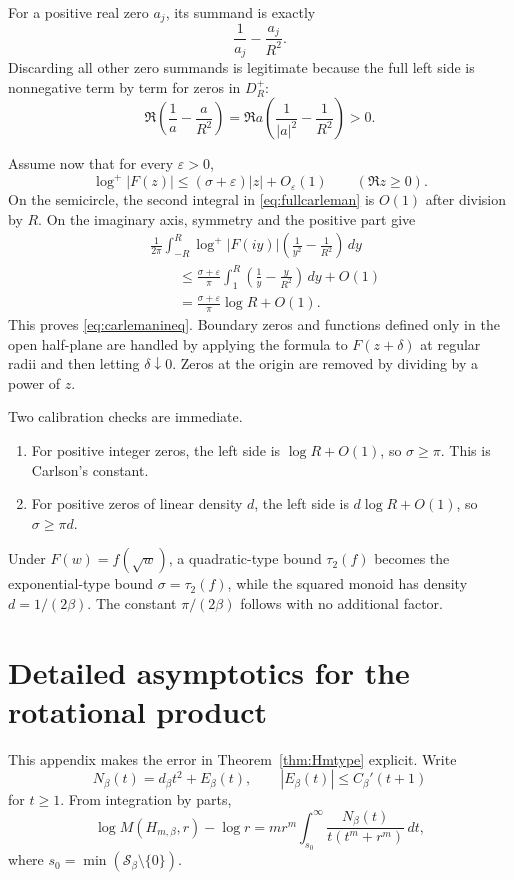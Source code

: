 \documentclass[11pt,oneside]{article}
\theoremstyle{definition}
\theoremstyle{remark}
\newcommand{\Sbeta}{\mathcal S_\beta}
\begin{document}
For a positive real zero $a_j$, its summand is exactly
\[
 \frac1{a_j}-\frac{a_j}{R^2}.
\]
Discarding all other zero summands is legitimate because the full left side is nonnegative
term by term for zeros in $D_R^+$:
\[
 \Re\left(\frac1a-\frac a{R^2}\right)
 =\Re a\left(\frac1{|a|^2}-\frac1{R^2}\right)>0.
\]

Assume now that for every $\varepsilon>0$,
\[
 \log^+|F(z)|\le(\sigma+\varepsilon)|z|+O_\varepsilon(1)
 \qquad(\Re z\ge0).
\]
On the semicircle, the second integral in \eqref{eq:fullcarleman} is $O(1)$ after division by
$R$.  On the imaginary axis, symmetry and the positive part give
\begin{align*}
 &\frac1{2\pi}\int_{-R}^{R}
   \log^+|F(iy)|\left(\frac1{y^2}-\frac1{R^2}\right)\,dy\\
 &\qquad\le
 \frac{\sigma+\varepsilon}{\pi}
 \int_1^R\left(\frac1y-\frac y{R^2}\right)\,dy+O(1)\\
 &\qquad=
 \frac{\sigma+\varepsilon}{\pi}\log R+O(1).
\end{align*}
This proves \eqref{eq:carlemanineq}.  Boundary zeros and functions defined only in the open
half-plane are handled by applying the formula to $F(z+\delta)$ at regular radii and then
letting $\delta\downarrow0$.  Zeros at the origin are removed by dividing by a power of
$z$.

Two calibration checks are immediate.

\begin{enumerate}
\item For positive integer zeros, the left side is $\log R+O(1)$, so $\sigma\ge\pi$.
This is Carlson's constant.
\item For positive zeros of linear density $d$, the left side is $d\log R+O(1)$, so
$\sigma\ge\pi d$.
\end{enumerate}

Under $F(w)=f(\sqrt w)$, a quadratic-type bound $\tau_2(f)$ becomes the exponential-type
bound $\sigma=\tau_2(f)$, while the squared monoid has density $d=1/(2\beta)$.  The constant
$\pi/(2\beta)$ follows with no additional factor.

\section{Detailed asymptotics for the rotational product}
\label{app:productasymptotic}

This appendix makes the error in Theorem~\ref{thm:Hmtype} explicit.  Write
\[
 N_\beta(t)=d_\beta t^2+E_\beta(t),
 \qquad |E_\beta(t)|\le C_\beta'(t+1)
\]
for $t\ge1$.  From integration by parts,
\[
 \log M(H_{m,\beta},r)-\log r
 =m r^m\int_{s_0}^{\infty}
       \frac{N_\beta(t)}{t(t^m+r^m)}\,dt,
\]
where $s_0=\min(\Sbeta\setminus\{0\})$.
\end{document}
